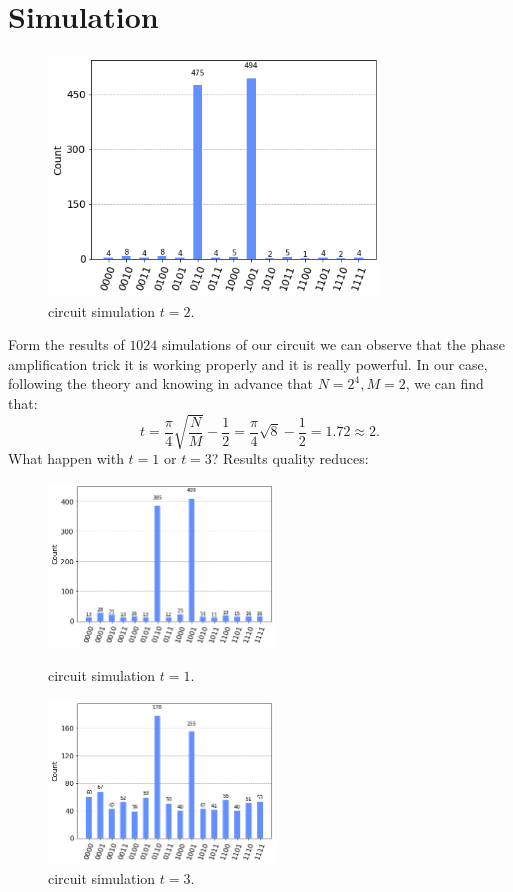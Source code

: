 \documentclass{article}
\begin{document}
\section{Simulation}
\begin{figure}[H]
  \centering
  \includegraphics[width=250pt]{Img/histogram.png}
  \caption{circuit simulation $t=2$.}
\end{figure}
Form the results of $1024$ simulations of our circuit we can observe that the
phase amplification trick it is working properly and it is really powerful.
In our case, following the theory and knowing in advance that $N = 2^4, M=2$,
we can find that:
\[
  t = \frac{\pi}{4} \sqrt{\frac{N}{M}}- \frac{1}{2} = \frac{\pi}{4}
  \sqrt{8}- \frac{1}{2} = 1.72 \approx 2.
\]
What happen with $t= 1$ or $t=3$? Results quality reduces:
\begin{figure}[H]
  \centering
  \begin{minipage}{.5\textwidth}
    \centering
    \includegraphics[width=6cm]{Img/histogram-t1.png}
    \caption{circuit simulation $t=1$.}
  \end{minipage}%
  \begin{minipage}{.5\textwidth}
    \centering
    \includegraphics[width=6cm]{Img/histogram-t3.png}
    \caption{circuit simulation $t=3$.}
  \end{minipage}
\end{figure}
\end{document}
